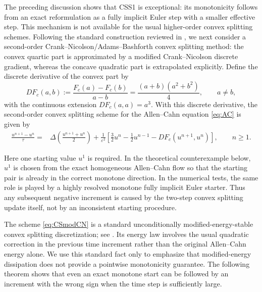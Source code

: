 \documentclass[final, 3p, times]{elsarticle}%
\newcommand{\eps}{\varepsilon}
\begin{document}
The preceding discussion shows that CSS1 is exceptional: its monotonicity follows from an exact reformulation as a fully implicit Euler step with a smaller effective step. This mechanism is not available for the usual higher-order convex splitting schemes. Following the standard construction reviewed in \cite{tangqiao2020phasefield}, we next consider a second-order Crank--Nicolson/Adams--Bashforth convex splitting method: the convex quartic part is approximated by a modified Crank--Nicolson discrete gradient, whereas the concave quadratic part is extrapolated explicitly.
Define the discrete derivative of the convex part by
\begin{equation}
    D F_c(a,b) := \frac{F_c(a)-F_c(b)}{a-b} =\frac{(a+b)(a^2+b^2)}{4},
    \qquad a\ne b,
    \label{eq:DFc-discrete-gradient}
\end{equation}
with the continuous extension \(D F_c(a,a)=a^3\). With this discrete derivative, the second-order convex splitting scheme for the Allen--Cahn equation \eqref{eq:AC} is given by
\begin{equation}
\begin{aligned}
    \frac{u^{n+1}-u^n}{\tau}
    ={}&\Delta \left(\frac{u^{n+1}+u^n}{2}\right)
    +\frac1{\eps^2}
    \left[
        \frac32u^n-\frac12u^{n-1}-D F_c(u^{n+1},u^n)
    \right],
    \qquad n\ge1.
\end{aligned}
    \label{eq:CSmodCN}
\end{equation}

Here one starting value \(u^1\) is required. In the theoretical counterexample below, \(u^1\) is chosen from the exact homogeneous Allen--Cahn flow so that the starting pair is already in the correct monotone direction. In the numerical tests, the same role is played by a highly resolved monotone fully implicit Euler starter. Thus any subsequent negative increment is caused by the two-step convex splitting update itself, not by an inconsistent starting procedure.

The scheme \eqref{eq:CSmodCN} is a standard unconditionally modified-energy-stable
convex splitting discretization; see \cite{tangqiao2020phasefield,guan2014second,guillen2014second,xu2023lack}.
Its energy law involves the usual quadratic correction in the previous time increment rather than
the original Allen--Cahn energy alone. We use this standard fact only to emphasize that modified-energy
dissipation does not provide a pointwise monotonicity guarantee. The following theorem shows that even an exact monotone start can be followed by an increment with the wrong sign when the time step is sufficiently large.
\end{document}
